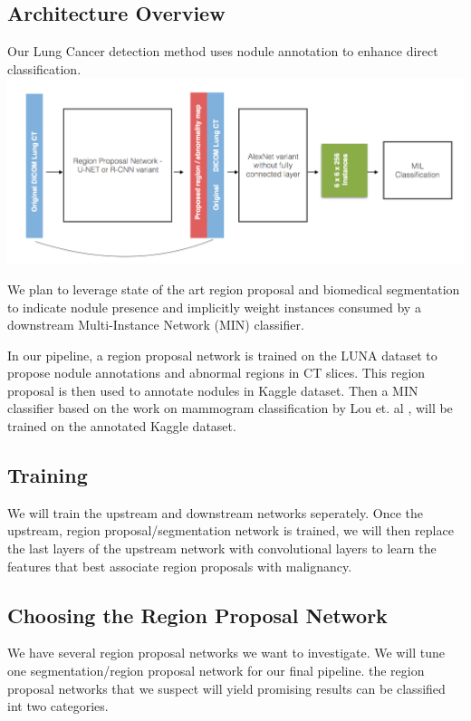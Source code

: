 \documentclass[twocolumn,10pt]{article}
\newcommand{\red}[1]{{\color{red}#1}}
\begin{document}
\subsection{\red{Architecture Overview}}
Our Lung Cancer detection method uses nodule annotation to enhance direct
classification. 
\includegraphics[width=\columnwidth]{img/architecture.png}


We plan to leverage state of the art region proposal and biomedical segmentation
to indicate nodule presence and implicitly weight instances consumed by a 
downstream Multi-Instance Network (MIN) classifier.

In our pipeline, a region proposal network is trained on the LUNA dataset to propose
nodule annotations and abnormal regions in CT slices. This region proposal 
is then used to annotate nodules in Kaggle dataset. Then a MIN classifier based 
on the work on mammogram  classification by Lou et. al \cite{DBLP:journals/corr/ZhuLVX16},
will be trained on the annotated Kaggle dataset.

\subsection{Training}
We will train the upstream and downstream networks seperately. Once the upstream,
region proposal/segmentation network is trained, we will then replace the last layers
of the upstream network with convolutional layers to learn the features that best
associate region proposals with malignancy.

\subsection{Choosing the Region Proposal Network}
We have several region proposal networks we want to investigate.
We will tune one segmentation/region proposal network for our final pipeline. 
the region proposal networks that we suspect will yield promising results can 
be classified int two categories.
\end{document}
